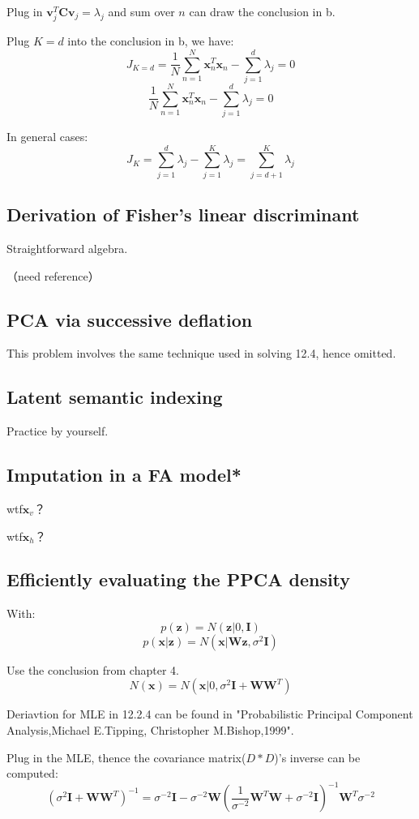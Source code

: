 \documentclass[UTF8]{ctexart}
\begin{document}
Plug in $\textbf{v}_{j}^{T}\textbf{C}\textbf{v}_{j}=\lambda_{j}$ and sum over $n$ can draw the conclusion in b.

Plug $K=d$ into the conclusion in b, we have:
$$J_{K=d}=\frac{1}{N}\sum_{n=1}^{N}\textbf{x}_{n}^{T}\textbf{x}_{n}-\sum_{j=1}^{d}\lambda_{j}=0$$
$$\frac{1}{N}\sum_{n=1}^{N}\textbf{x}_{n}^{T}\textbf{x}_{n}-\sum_{j=1}^{d}\lambda_{j}=0$$

In general cases:
$$J_{K}=\sum_{j=1}^{d}\lambda_{j}-\sum_{j=1}^{K}\lambda_{j}=\sum_{j=d+1}^{K}\lambda_{j}$$

\subsection{Derivation of Fisher's linear discriminant}
Straightforward algebra.

（need reference）

\subsection{PCA via successive deflation}
This problem involves the same technique used in solving 12.4, hence omitted.

\subsection{Latent semantic indexing}
Practice by yourself.

\subsection{Imputation in a FA model*}
wtf$\textbf{x}_{v}$？

wtf$\textbf{x}_{h}$？


\subsection{Efficiently evaluating the PPCA density}
With:
$$p(\textbf{z})=N(\textbf{z}|0,\textbf{I})$$
$$p(\textbf{x}|\textbf{z})=N(\textbf{x}|\textbf{W}\textbf{z},\sigma^{2}\textbf{I})$$

Use the conclusion from chapter 4.
$$N(\textbf{x})=N(\textbf{x}|0,\sigma^{2}\textbf{I}+\textbf{W}\textbf{W}^{T})$$

Deriavtion for MLE in 12.2.4 can be found in "Probabilistic Principal Component Analysis,Michael E.Tipping, Christopher M.Bishop,1999".

Plug in the MLE, thence the covariance matrix($D*D$)'s inverse can be computed:
$$(\sigma^{2}\textbf{I}+\textbf{W}\textbf{W}^{T})^{-1}=\sigma^{-2}\textbf{I} - \sigma^{-2}\textbf{W}(\frac{1}{\sigma^{-2}}\textbf{W}^{T}\textbf{W}+\sigma^{-2}\textbf{I})^{-1}\textbf{W}^{T}\sigma^{-2}$$
\end{document}
